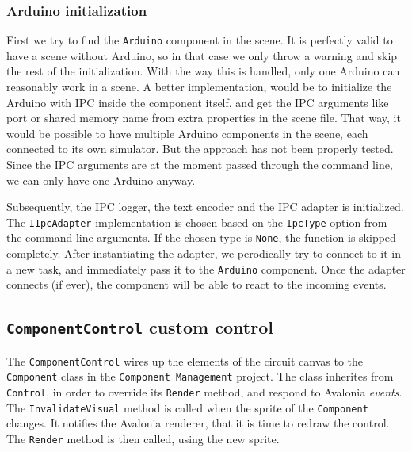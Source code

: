 
\subsubsection{Arduino initialization}

First we try to find the \texttt{Arduino} component in the scene. It is perfectly valid to have a scene without Arduino, so in that case we only throw a warning and skip the rest of the initialization. With the way this is handled, only one Arduino can reasonably work in a scene. A better implementation, would be to initialize the Arduino with IPC inside the component itself, and get the IPC arguments like port or shared memory name from extra properties in the scene file. That way, it would be possible to have multiple Arduino components in the scene, each connected to its own simulator. But the approach has not been properly tested. Since the IPC arguments are at the moment passed through the command line, we can only have one Arduino anyway.

Subsequently, the IPC logger, the text encoder and the IPC adapter is initialized. The \texttt{IIpcAdapter} implementation is chosen based on the \texttt{IpcType} option from the command line arguments. If the chosen type is \texttt{None}, the function is skipped completely. After instantiating the adapter, we perodically try to connect to it in a new task, and immediately pass it to the \texttt{Arduino} component. Once the adapter connects (if ever), the component will be able to react to the incoming events.

\subsection{\texttt{ComponentControl} custom control}

The \texttt{ComponentControl} wires up the elements of the circuit canvas to the \texttt{Component} class in the \texttt{Component Management} project. The class inherites from \texttt{Control}, in order to override its \texttt{Render} method, and respond to Avalonia \textit{events}. The \texttt{InvalidateVisual} method is called when the sprite of the \texttt{Component} changes. It notifies the Avalonia renderer, that it is time to redraw the control. The \texttt{Render} method is then called, using the new sprite.

